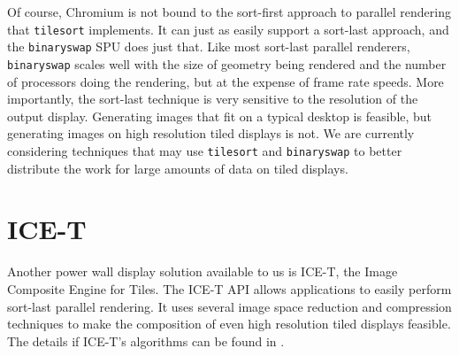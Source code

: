 \documentclass[twocolumn]{article}
\newcommand{\cidentifier}[1]{\texttt{#1}}
\begin{document}
  Of course, Chromium is not bound to the sort-first approach to parallel
  rendering that \cidentifier{tile\-sort} implements.  It can just as
  easily support a sort-last approach, and the \cidentifier{binary\-swap}
  SPU does just that.  Like most sort-last parallel renderers,
  \cidentifier{binary\-swap} scales well with the size of geometry being
  rendered and the number of processors doing the rendering, but at the
  expense of frame rate speeds.  More importantly, the sort-last technique
  is very sensitive to the resolution of the output display.  Generating
  images that fit on a typical desktop is feasible, but generating images
  on high resolution tiled displays is not.  We are currently considering
  techniques that may use \cidentifier{tile\-sort} and
  \cidentifier{binary\-swap} to better distribute the work for large
  amounts of data on tiled displays.



  \section{ICE-T}
  \label{sec:ICE-T}

  Another power wall display solution available to us is ICE-T, the Image
  Composite Engine for Tiles.  The ICE-T API allows applications to easily
  perform sort-last parallel rendering.  It uses several image space
  reduction and compression techniques to make the composition of even high
  resolution tiled displays feasible.  The details if ICE-T's algorithms
  can be found in \cite{Moreland01}.
\end{document}
